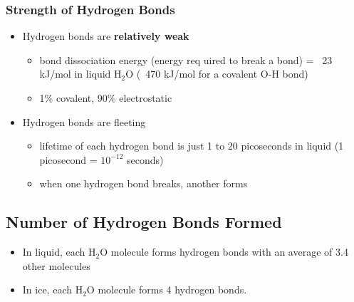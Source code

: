 \documentclass[10pt]{article}
\begin{document}
\subsubsection*{Strength of Hydrogen Bonds}
\begin{itemize}
    \item Hydrogen bonds are \textbf{relatively weak}
    \begin{itemize}
        \item bond dissociation energy (energy req  uired to break a bond) = ~23 kJ/mol in liquid H$_2$O (~470 kJ/mol for a covalent O-H bond)
        \item 1\% covalent, 90\% electrostatic
    \end{itemize}
    \item Hydrogen bonds are fleeting
    \begin{itemize}
        \item lifetime of each hydrogen bond is just 1 to 20 picoseconds in liquid (1 picosecond = $10^{-12}$ seconds)
        \item when one hydrogen bond breaks, another forms
    \end{itemize}
\end{itemize}
\subsection*{Number of Hydrogen Bonds Formed}
\begin{itemize}
    \item In liquid, each H$_2$O molecule forms hydrogen bonds with an average of 3.4 other molecules
    \item In ice, each H$_2$O molecule forms 4 hydrogen bonds.
\end{itemize}
\end{document}

